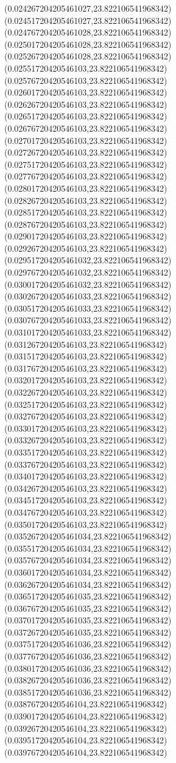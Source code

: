 {(0.024267204205461027,23.822106541968342)
(0.024517204205461027,23.822106541968342)
(0.024767204205461028,23.822106541968342)
(0.025017204205461028,23.822106541968342)
(0.025267204205461028,23.822106541968342)
(0.02551720420546103,23.822106541968342)
(0.02576720420546103,23.822106541968342)
(0.02601720420546103,23.822106541968342)
(0.02626720420546103,23.822106541968342)
(0.02651720420546103,23.822106541968342)
(0.02676720420546103,23.822106541968342)
(0.02701720420546103,23.822106541968342)
(0.02726720420546103,23.822106541968342)
(0.02751720420546103,23.822106541968342)
(0.02776720420546103,23.822106541968342)
(0.02801720420546103,23.822106541968342)
(0.02826720420546103,23.822106541968342)
(0.02851720420546103,23.822106541968342)
(0.02876720420546103,23.822106541968342)
(0.02901720420546103,23.822106541968342)
(0.02926720420546103,23.822106541968342)
(0.029517204205461032,23.822106541968342)
(0.029767204205461032,23.822106541968342)
(0.030017204205461032,23.822106541968342)
(0.030267204205461033,23.822106541968342)
(0.030517204205461033,23.822106541968342)
(0.030767204205461033,23.822106541968342)
(0.031017204205461033,23.822106541968342)
(0.03126720420546103,23.822106541968342)
(0.03151720420546103,23.822106541968342)
(0.03176720420546103,23.822106541968342)
(0.03201720420546103,23.822106541968342)
(0.03226720420546103,23.822106541968342)
(0.03251720420546103,23.822106541968342)
(0.03276720420546103,23.822106541968342)
(0.03301720420546103,23.822106541968342)
(0.03326720420546103,23.822106541968342)
(0.03351720420546103,23.822106541968342)
(0.03376720420546103,23.822106541968342)
(0.03401720420546103,23.822106541968342)
(0.03426720420546103,23.822106541968342)
(0.03451720420546103,23.822106541968342)
(0.03476720420546103,23.822106541968342)
(0.03501720420546103,23.822106541968342)
(0.035267204205461034,23.822106541968342)
(0.035517204205461034,23.822106541968342)
(0.035767204205461034,23.822106541968342)
(0.036017204205461034,23.822106541968342)
(0.036267204205461034,23.822106541968342)
(0.036517204205461035,23.822106541968342)
(0.036767204205461035,23.822106541968342)
(0.037017204205461035,23.822106541968342)
(0.037267204205461035,23.822106541968342)
(0.037517204205461036,23.822106541968342)
(0.037767204205461036,23.822106541968342)
(0.038017204205461036,23.822106541968342)
(0.038267204205461036,23.822106541968342)
(0.038517204205461036,23.822106541968342)
(0.03876720420546104,23.822106541968342)
(0.03901720420546104,23.822106541968342)
(0.03926720420546104,23.822106541968342)
(0.03951720420546104,23.822106541968342)
(0.03976720420546104,23.822106541968342)
}
